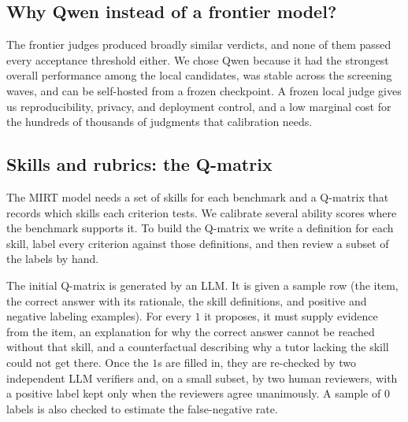 \subsection{Why Qwen instead of a frontier model?}
\label{sec:frq-judge-whyqwen}
The frontier judges produced broadly similar verdicts, and none of them passed
every acceptance threshold either. We chose Qwen because it had the strongest
overall performance among the local candidates, was stable across the screening
waves, and can be self-hosted from a frozen checkpoint. A frozen local judge
gives us reproducibility, privacy, and deployment control, and a low marginal
cost for the hundreds of thousands of judgments that calibration needs.

\subsection{Skills and rubrics: the Q-matrix}
\label{sec:frq-judge-qmatrix}
The MIRT model needs a set of skills for each benchmark and a Q-matrix that
records which skills each criterion tests. We calibrate several ability scores
where the benchmark supports it. To build the Q-matrix we write a definition for
each skill, label every criterion against those definitions, and then review a
subset of the labels by hand.


The initial Q-matrix is generated by an LLM. It is given a sample row (the item,
the correct answer with its rationale, the skill definitions, and positive and
negative labeling examples). For every $1$ it proposes, it must supply evidence
from the item, an explanation for why the correct answer cannot be reached
without that skill, and a counterfactual describing why a tutor lacking the skill
could not get there. Once the $1$s are filled in, they are re-checked by two
independent LLM verifiers and, on a small subset, by two human reviewers, with a
positive label kept only when the reviewers agree unanimously. A sample of $0$
labels is also checked to estimate the false-negative rate.


